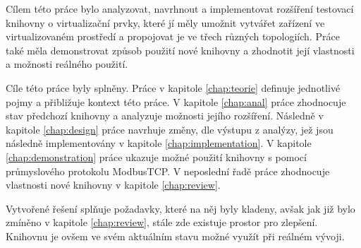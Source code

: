 \begin{conclusion}
Cílem této práce bylo analyzovat, navrhnout a implementovat rozšíření testovací knihovny o virtualizační prvky, které jí měly umožnit vytvářet zařízení ve virtualizovaném prostředí a propojovat je ve třech různých topologiích. Práce také měla demonstrovat způsob použití nové knihovny a zhodnotit její vlastnosti a možnosti reálného použití.

Cíle této práce byly splněny. Práce v kapitole \ref{chap:teorie} definuje jednotlivé pojmy a přibližuje kontext této práce. V kapitole \ref{chap:anal} práce zhodnocuje stav předchozí knihovny a analyzuje možnosti jejího rozšíření. Následně v kapitole \ref{chap:design} práce navrhuje změny, dle výstupu z analýzy, jež jsou následně implementovány v kapitole \ref{chap:implementation}. V kapitole \ref{chap:demonstration} práce ukazuje možné použití knihovny s pomocí průmyslového protokolu ModbusTCP. V neposlední řadě práce zhodnocuje vlastnosti nové knihovny v kapitole \ref{chap:review}.

Vytvořené řešení splňuje požadavky, které na něj byly kladeny, avšak jak již bylo zmíněno v kapitole \ref{chap:review}, stále zde existuje prostor pro zlepšení. Knihovnu je ovšem ve svém aktuálním stavu možné využít při reálném vývoji. 
\end{conclusion}